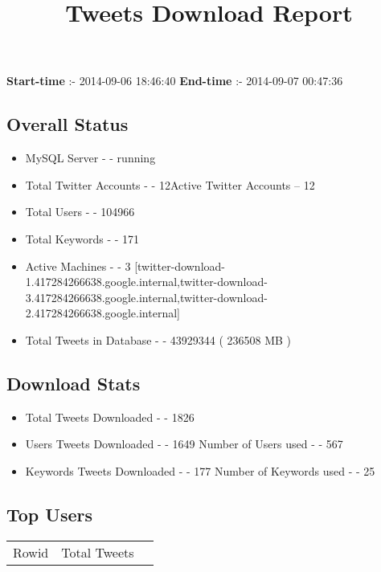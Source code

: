 \documentclass{article}\usepackage[T1]{fontenc}
\begin{document}
\title{\textbf{Tweets Download Report}}
               \date{}
                \maketitle
               \centerline{\textbf{Start-time} :- 2014-09-06 18:46:40 \hspace{40pt} \textbf{End-time} :- 2014-09-07 00:47:36}               \subsection*{Overall Status}                \begin{itemize}                \item MySQL Server - - running               \item Total Twitter Accounts - - 12\newline Active Twitter Accounts -- 12               \item Total Users - - 104966               \item Total Keywords - - 171               \item Active Machines - - 3 [twitter-download-1.417284266638.google.internal,twitter-download-3.417284266638.google.internal,twitter-download-2.417284266638.google.internal]               \item Total Tweets in Database - - 43929344 ( 236508 MB )               \end{itemize}               \subsection*{Download Stats}                \begin{itemize}                \item Total Tweets Downloaded - - 1826               \item Users Tweets Downloaded - - 1649 \newline Number of Users used - - 567               \item Keywords Tweets Downloaded - - 177 \newline Number of Keywords used - - 25              \end{itemize}              \subsection*{Top Users}\begin{tabular}{|c|c|c|}         \hline         Rowid & Total Tweets \\ 

\end{tabular}
\end{document}
